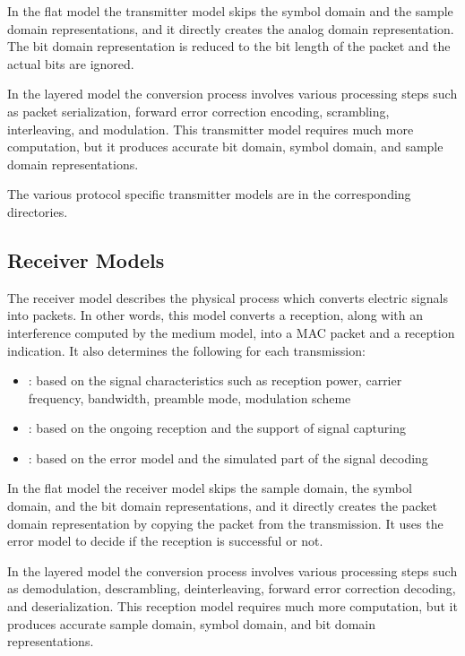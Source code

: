 In the flat model the transmitter model skips the symbol domain and the sample
domain representations, and it directly creates the analog domain representation.
The bit domain representation is reduced to the bit length of the packet and the
actual bits are ignored.

In the layered model the conversion process involves various processing steps
such as packet serialization, forward error correction encoding, scrambling,
interleaving, and modulation. This transmitter model requires much more
computation, but it produces accurate bit domain, symbol domain, and sample
domain representations.

The various protocol specific transmitter models are in the corresponding
directories.

\subsection{Receiver Models}

The receiver model describes the physical process which converts electric
signals into packets. In other words, this model converts a reception, along
with an interference computed by the medium model, into a MAC packet and a
reception indication. It also determines the following for each transmission: 

\begin{itemize}
  \item {}: based on the signal
characteristics such as reception power, carrier frequency, bandwidth, preamble
mode, modulation scheme
  \item {}: based
on the ongoing reception and the support of signal capturing
  \item {}:
based on the error model and the simulated part of the signal decoding
\end{itemize}

In the flat model the receiver model skips the sample domain, the symbol domain,
and the bit domain representations, and it directly creates the packet domain
representation by copying the packet from the transmission. It uses the error
model to decide if the reception is successful or not.

In the layered model the conversion process involves various processing steps
such as demodulation, descrambling, deinterleaving, forward error correction
decoding, and deserialization. This reception model requires much more
computation, but it produces accurate sample domain, symbol domain, and bit
domain representations.

